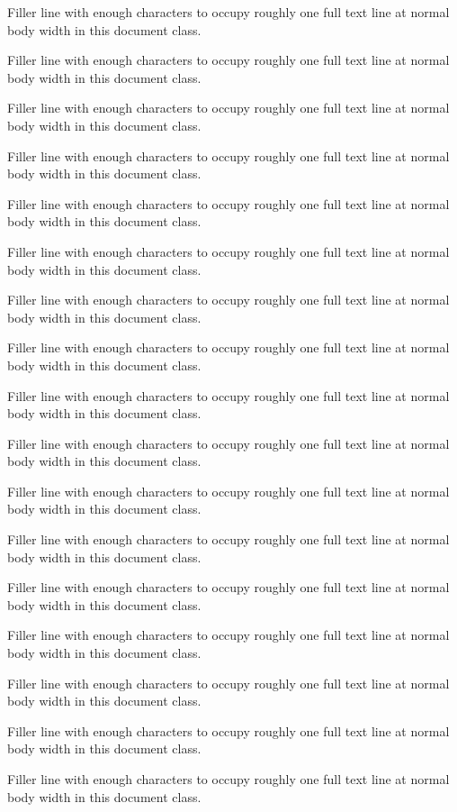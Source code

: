 \documentclass{reportkit}
\begin{document}
Filler line with enough characters to occupy roughly one full text line at normal body width in this document class.

Filler line with enough characters to occupy roughly one full text line at normal body width in this document class.

Filler line with enough characters to occupy roughly one full text line at normal body width in this document class.

Filler line with enough characters to occupy roughly one full text line at normal body width in this document class.

Filler line with enough characters to occupy roughly one full text line at normal body width in this document class.

Filler line with enough characters to occupy roughly one full text line at normal body width in this document class.

Filler line with enough characters to occupy roughly one full text line at normal body width in this document class.

Filler line with enough characters to occupy roughly one full text line at normal body width in this document class.

Filler line with enough characters to occupy roughly one full text line at normal body width in this document class.

Filler line with enough characters to occupy roughly one full text line at normal body width in this document class.

Filler line with enough characters to occupy roughly one full text line at normal body width in this document class.

Filler line with enough characters to occupy roughly one full text line at normal body width in this document class.

Filler line with enough characters to occupy roughly one full text line at normal body width in this document class.

Filler line with enough characters to occupy roughly one full text line at normal body width in this document class.

Filler line with enough characters to occupy roughly one full text line at normal body width in this document class.

Filler line with enough characters to occupy roughly one full text line at normal body width in this document class.

Filler line with enough characters to occupy roughly one full text line at normal body width in this document class.
\end{document}

